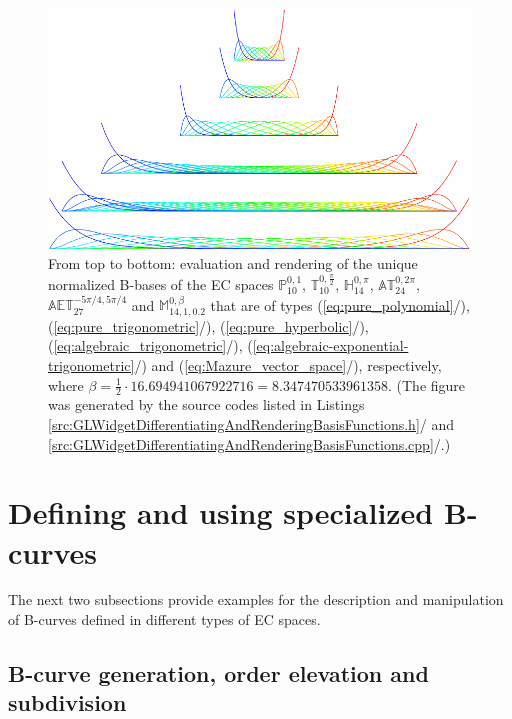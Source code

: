 \documentclass[b5paper, twosided]{book}
\DeclareRobustCommand{\mref}[1]{\ref{#1}{\relsize{-1}/\pageref{#1}}}
\begin{document}
\begin{figure}[!htb]
    \centering
    \includegraphics[]{images/differentiation_and_rendering_of_B_bases+.pdf}
    \caption{From top to bottom: evaluation and rendering of the unique normalized B-bases of the EC spaces $\mathbb{P}_{10}^{0,1}$, $\mathbb{T}_{10}^{0,\frac{\pi}{2}}$, $\mathbb{H}_{14}^{0,\pi}$, $\mathbb{AT}_{24}^{0,2\pi}$, $\mathbb{AET}_{27}^{-5\pi/4,5\pi/4}$ and $\mathbb{M}_{14,1,0.2}^{0,\beta}$ that are of types (\mref{eq:pure_polynomial}), (\mref{eq:pure_trigonometric}), (\mref{eq:pure_hyperbolic}), (\mref{eq:algebraic_trigonometric}), (\mref{eq:algebraic-exponential-trigonometric}) and (\mref{eq:Mazure_vector_space}), respectively, where $\beta = \frac{1}{2}\cdot 16.694941067922716 = 8.347470533961358$. (The figure was generated by the source codes listed in Listings \mref{src:GLWidgetDifferentiatingAndRenderingBasisFunctions.h} and \mref{src:GLWidgetDifferentiatingAndRenderingBasisFunctions.cpp}.)}
    \label{fig:differentiation_and_rendering_of_B_bases}
\end{figure}

\section{Defining and using specialized B-curves}\label{sec:Defining_and_using_specialized_EC_B-curves}

The next two subsections provide examples for the description and manipulation of B-curves defined in different types of EC spaces.

\subsection{B-curve generation, order elevation and subdivision}\label{subsec:B-curve_generation_order_elevation_and_subdivision}
\end{document}
